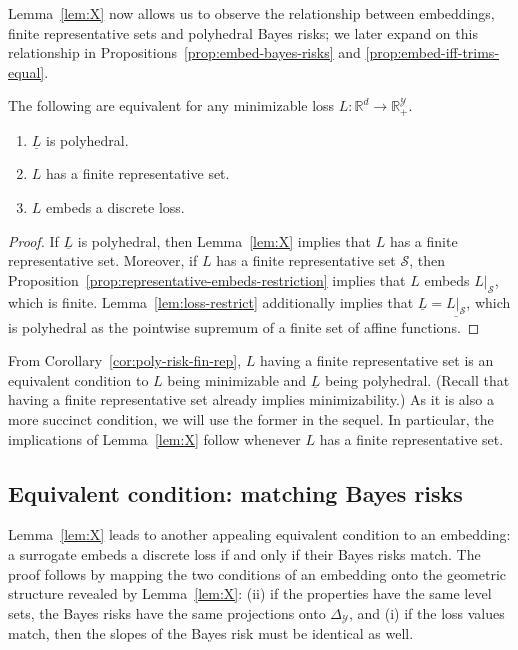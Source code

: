 \documentclass[twoside,11pt]{article}
\newcommand{\reals}{\mathbb{R}}
\newcommand{\simplex}{\Delta_\Y}
\newcommand{\Sc}{\mathcal{S}}
\newcommand{\Y}{\mathcal{Y}}
\newcommand{\risk}[1]{\underline{#1}}
\begin{document}
Lemma~\ref{lem:X} now allows us to observe the relationship between embeddings, finite representative sets and polyhedral Bayes risks; we later expand on this relationship in Propositions~\ref{prop:embed-bayes-risks} and \ref{prop:embed-iff-trims-equal}.
\begin{corollary}\label{cor:poly-risk-fin-rep}
  The following are equivalent for any minimizable loss $L:\reals^d\to\reals^\Y_+$.
  \begin{enumerate}
  \item $\risk{L}$ is polyhedral.
  \item $L$ has a finite representative set.
  \item $L$ embeds a discrete loss.
  \end{enumerate}
\end{corollary}
\begin{proof}
	If $\risk L$ is polyhedral, then Lemma~\ref{lem:X} implies that $L$ has a finite representative set.
	Moreover, if $L$ has a finite representative set $\Sc$, then Proposition~\ref{prop:representative-embeds-restriction} implies that $L$ embeds $L|_{\Sc}$, which is finite.
	Lemma~\ref{lem:loss-restrict} additionally implies that $\risk L = \risk{L|_{\Sc}}$, which is polyhedral as the pointwise supremum of a finite set of affine functions.
\end{proof}

From Corollary~\ref{cor:poly-risk-fin-rep}, $L$ having a finite representative set is an equivalent condition to $L$ being minimizable and $\risk{L}$ being polyhedral.
(Recall that having a finite representative set already implies minimizability.)
As it is also a more succinct condition, we will use the former in the sequel.
In particular, the implications of Lemma~\ref{lem:X} follow whenever $L$ has a finite representative set.


\subsection{Equivalent condition: matching Bayes risks}\label{subsec:match-BR}


Lemma~\ref{lem:X} leads to another appealing equivalent condition to an embedding: a surrogate embeds a discrete loss if and only if their Bayes risks match.
The proof follows by mapping the two conditions of an embedding onto the geometric structure revealed by Lemma~\ref{lem:X}: (ii) if the properties have the same level sets, the Bayes risks have the same projections onto $\simplex$, and (i) if the loss values match, then the slopes of the Bayes risk must be identical as well.
\end{document}
